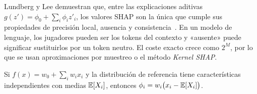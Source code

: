 Lundberg y Lee demuestran que, entre las explicaciones aditivas $g(z')=\phi_0+\sum_i\phi_iz'_i$, los valores SHAP son la única que cumple sus propiedades de precisión local, ausencia y consistencia~\cite[teorema~1]{lundberg}. En un modelo de lenguaje, los jugadores pueden ser los tokens del contexto y «ausente» puede significar sustituirlos por un token neutro. El coste exacto crece como $2^{M}$, por lo que se usan aproximaciones por muestreo o el método \emph{Kernel SHAP}.

\begin{proposicion}\label{prop:shap-lineal}
Si $f(x)=w_0+\sum_iw_ix_i$ y la distribución de referencia tiene características independientes con medias $\mathbb{E}[X_i]$, entonces $\phi_i=w_i\bigl(x_i-\mathbb{E}[X_i]\bigr)$.
\end{proposicion}

